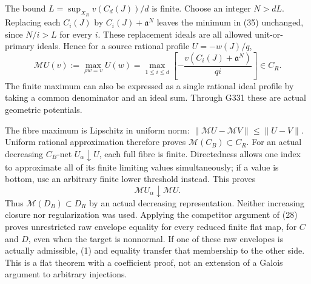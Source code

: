 \documentclass[11pt]{article}
\begin{document}
The bound \(L=\sup_{X_R}v(C_d(J))/d\) is finite.
Choose an integer \(N>dL\). Replacing each \(C_i(J)\) by
\(C_i(J)+\mathfrak a^N\) leaves the minimum in (35)
unchanged, since \(N/i>L\) for every \(i\).
These replacement ideals are all allowed unit-or-primary
ideals. Hence for a source rational profile \(U=-w(J)/q\),
\[
 \mathcal M U(v):=\max_{\rho w=v}U(w)
  =\max_{1\leq i\leq d}
       \left[-\frac{v(C_i(J)+\mathfrak a^N)}{qi}\right]\in C_R.
                                                               \tag{36}
\]
The finite maximum can also be expressed as a single rational
ideal profile by taking a common denominator and an ideal sum.
Through G331 these are actual geometric potentials.

The fibre maximum is Lipschitz in uniform norm:
\(\|\mathcal M U-\mathcal M V\|\leq\|U-V\|\).
Uniform rational approximation therefore proves
\(\mathcal M(C_B)\subset C_R\).
For an actual decreasing \(C_B\)-net \(U_\alpha\downarrow U\),
each full fibre is finite. Directedness allows one index
to approximate all of its finite limiting values
simultaneously; if a value is bottom, use an arbitrary
finite lower threshold instead. This proves
\[
 \mathcal M U_\alpha\downarrow\mathcal M U .
 \]
Thus \(\mathcal M(D_B)\subset D_R\) by an actual decreasing
representation. Neither increasing closure nor regularization
was used. Applying the competitor argument of (28) proves
unrestricted raw envelope equality for every reduced finite
flat map, for \(C\) and \(D\), even when the target is
nonnormal. If one of these raw envelopes is actually
admissible, (1) and equality transfer that membership to
the other side.
This is a flat theorem with a coefficient proof, not an
extension of a Galois argument to arbitrary injections.
\end{document}
